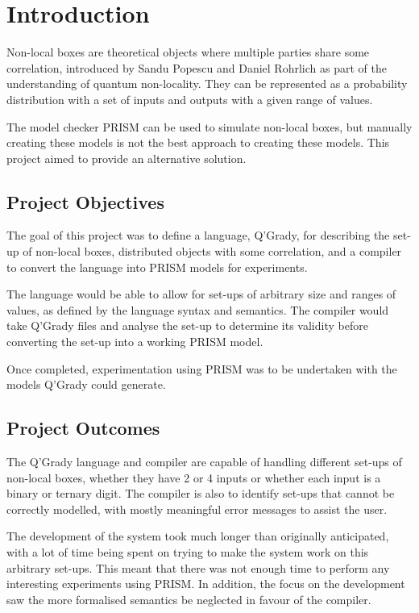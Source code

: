 \documentclass[report.tex]{subfiles}
\begin{document}
\chapter{Introduction} %
\label{cha:introduction}
Non-local boxes are theoretical objects where multiple parties share some
correlation, introduced by Sandu Popescu and Daniel Rohrlich as part of the
understanding of quantum non-locality. They can be represented as a probability
distribution with a set of inputs and outputs with a given range of values.

The model checker PRISM can be used to simulate non-local boxes, but manually creating these models is not the best approach to creating these models. This
project aimed to provide an alternative solution.

\section{Project Objectives} %
\label{sec:project_objectives}
The goal of this project was to define a language, Q'Grady, for describing the
set-up of non-local boxes, distributed objects with some correlation, and a
compiler to convert the language into PRISM models for experiments.

The language would be able to allow for set-ups of arbitrary size and ranges of
values, as defined by the language syntax and semantics. The compiler would take
Q'Grady files and analyse the set-up to determine its validity before converting the set-up into a working PRISM model.

Once completed, experimentation using PRISM was to be undertaken with the models
Q'Grady could generate.
\section{Project Outcomes} %
\label{sec:project_outcomes}
The Q'Grady language and compiler are capable of handling different set-ups of
non-local boxes, whether they have 2 or 4 inputs or whether each input is a
binary or ternary digit. The compiler is also to identify set-ups that cannot be
correctly modelled, with mostly meaningful error messages to assist the user.

The development of the system took much longer than originally anticipated, with
a lot of time being spent on trying to make the system work on this arbitrary
set-ups. This meant that there was not enough time to perform any interesting
experiments using PRISM. In addition, the focus on the development saw the
more formalised semantics be neglected in favour of the compiler.
\end{document}
